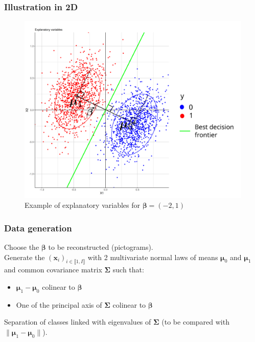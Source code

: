 \documentclass{beamer}
\begin{document}
\begin{frame}
    \frametitle{Illustration in 2D}

    \begin{figure}
        \centering
        \includegraphics[scale = 0.2]{images/2D_better.png}
        \caption{Example of explanatory variables for $\bm{\beta} = (-2,1)$}
    \end{figure}
\end{frame}

\begin{frame}
    \frametitle{Data generation}
    Choose the $\bm{\beta}$ to be reconstructed (pictograms).\\[10 pt]
    Generate the $(\mathbf{x}_i)_{i \in \llbracket 1, I\rrbracket}$ with 2 multivariate normal laws of means $\bm{\mu}_0$ and $\bm{\mu}_1$ and common covariance matrix $\bm{\Sigma}$ such that:
    \begin{itemize}
        \item $\bm{\mu}_1 - \bm{\mu}_0$ colinear to $\bm{\beta}$\\[10 pt]
        \item One of the principal axis of $\bm{\Sigma}$ colinear to $\bm{\beta}$
    \end{itemize}
    Separation of classes linked with eigenvalues of $\bm{\Sigma}$ (to be compared with $\lVert\bm{\mu}_1 - \bm{\mu}_0 \rVert$).
\end{frame}
\end{document}
